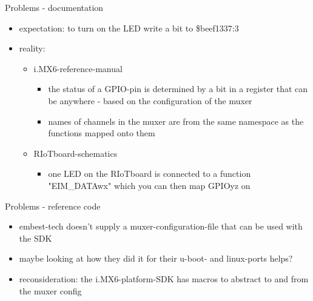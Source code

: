 \documentclass[9pt]{beamer}
\begin{document}
\begin{frame}{Problems - documentation}
 \begin{itemize}
 \item expectation: to turn on the LED write a bit to \$beef1337:3
 \item reality:
 	\begin{itemize}
 \item i.MX6-reference-manual
 		\begin{itemize}
 \item the status of a GPIO-pin is determined by a bit in a register that can be anywhere - based on the configuration of the muxer
 \item names of channels in the muxer are from the same namespace as the functions mapped onto them
 		\end{itemize}
 \item RIoTboard-schematics
 		\begin{itemize}
 \item one LED on the RIoTboard is connected to a function "EIM\_DATAwx" \textcolor{light-gray}{which you can then map GPIOyz on}
 		\end{itemize}
 	\end{itemize}
 \end{itemize}
\end{frame}

\begin{frame}{Problems - reference code}
 \begin{itemize}
 \item embest-tech doesn't supply a muxer-configuration-file that can be used with the SDK
 \item maybe looking at how they did it for their u-boot- and linux-ports helps?
 \item reconsideration: the i.MX6-platform-SDK has macros to abstract to and from the muxer config
 \end{itemize}
\end{frame}
\end{document}
